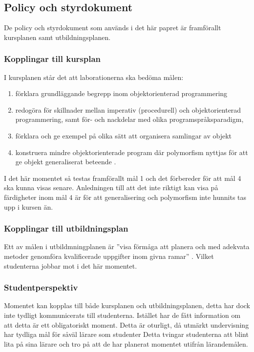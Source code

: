 \documentclass[a4paper, 10pt]{article}
\begin{document}
\subsection{Policy och styrdokument}

De policy och styrdokument som används i det 
här papret är framförallt kursplanen samt 
utbildningsplanen.

\subsubsection{Kopplingar till kursplan}

I kursplanen står det att laborationerna ska 
bedöma målen:

\begin{enumerate}
    \item förklara grundläggande begrepp inom objektorienterad programmering
    \item redogöra för skillnader mellan imperativ (procedurell) och objektorienterad programmering, samt för- och nackdelar med olika programspråksparadigm,
    \item förklara och ge exempel på olika sätt att organisera samlingar av objekt
    \item konstruera mindre objektorienterade program där polymorfism nyttjas för att ge objekt generaliserat beteende \parencite{cd102a2025}.
\end{enumerate}

I det här momentet så testas framförallt mål 1 
och det förbereder för att mål 4 ska kunna visas 
senare. Anledningen till att det inte riktigt kan 
visa på färdigheter inom mål 4 är för att 
generalisering och polymorfism inte hunnits tas 
upp i kursen än. 

\subsubsection{Kopplingar till utbildningsplan}

Ett av målen i utbildmningplanen är ''visa 
förmåga att planera och med adekvata metoder 
genomföra kvalificerade uppgifter inom givna 
ramar'' \parencite{tcdat2025}. Vilket studenterna 
jobbar mot i det här momentet.

\subsubsection{Studentperspektiv}

Momentet kan kopplas till både kursplanen och 
utbildningsplanen, detta har dock inte tydligt 
kommunicerats till studenterna. Istället har 
de fått information om att detta är ett 
obligatoriskt moment. Detta är oturligt, då 
utmärkt undervisning har tydliga mål för såväl 
lärare som studenter \parencite[sida 142]{branden2022}
Detta tvingar studenterna att blint lita på 
sina lärare och tro på att de har planerat 
momentet utifrån lärandemålen.
\end{document}

